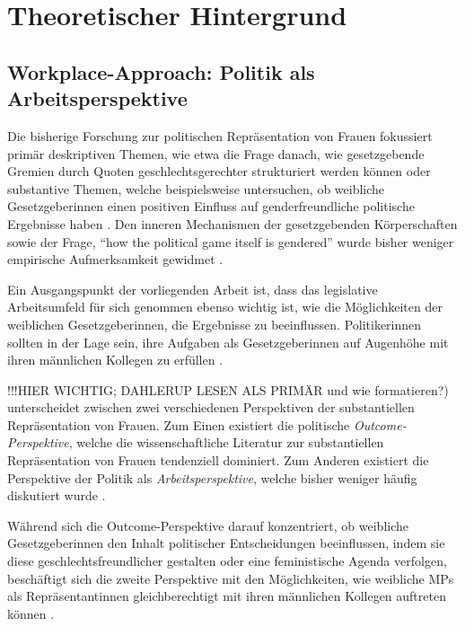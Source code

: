 \documentclass[12pt, 
    twoside=false, 
    bibliography=totoc, 
    numbers=endperiod, 
    headings=normal, 
    toc=chapterentrydotfill
    ]{scrbook}
\begin{document}
\chapter{Theoretischer Hintergrund}

\section{Workplace-Approach: Politik als Arbeitsperspektive} 

Die bisherige Forschung zur politischen Repräsentation von Frauen fokussiert primär deskriptiven Themen, wie etwa die Frage danach, wie gesetzgebende Gremien durch Quoten geschlechtsgerechter strukturiert werden können \parencites [vgl.]{dahlerup_2005}{schwindt-bayer_2009} oder substantive Themen, welche beispielsweise untersuchen, ob weibliche Gesetzgeberinnen einen positiven Einfluss auf genderfreundliche politische Ergebnisse haben \parencites [199]{erikson_2018}{beckwith_2007}. Den inneren Mechanismen der gesetzgebenden Körperschaften sowie der Frage, \enquote{how the political game itself is gendered} wurde bisher weniger empirische Aufmerksamkeit gewidmet \parencites[199]{erikson_2018}[vgl.][]{childs_2016}{dahlerup_2013}{wangnerud_2015}.

Ein Ausgangspunkt der vorliegenden Arbeit ist, dass das legislative Arbeitsumfeld für sich genommen ebenso wichtig ist, wie die Möglichkeiten der weiblichen Gesetzgeberinnen, die Ergebnisse zu beeinflussen. Politikerinnen sollten in der Lage sein, ihre Aufgaben als Gesetzgeberinnen auf Augenhöhe mit ihren männlichen Kollegen zu erfüllen \parencite[199]{erikson_2018}. 

\textcites{dahlerup_2006}{dahlerup_1988} !!!HIER WICHTIG; DAHLERUP LESEN ALS PRIMÄR und wie formatieren?) unterscheidet zwischen zwei verschiedenen Perspektiven der substantiellen Repräsentation von Frauen. Zum Einen existiert die politische \emph{Outcome-Perspektive}, welche die wissenschaftliche Literatur zur substantiellen Repräsentation von Frauen tendenziell dominiert. Zum Anderen existiert die Perspektive der Politik als \emph{Arbeitsperspektive}, welche bisher weniger häufig diskutiert wurde \parencites[513]{dahlerup_2006}[199]{erikson_2018}. 

Während sich die Outcome-Perspektive darauf konzentriert, ob weibliche Gesetzgeberinnen den Inhalt politischer Entscheidungen beeinflussen, indem sie diese geschlechtsfreundlicher gestalten oder eine feministische Agenda verfolgen, beschäftigt sich die zweite Perspektive mit den Möglichkeiten, wie weibliche MPs als Repräsentantinnen gleichberechtigt mit ihren männlichen Kollegen auftreten können \parencites[199]{erikson_2018}{dahlerup_2006}{dahlerup_1988}.
\end{document}
